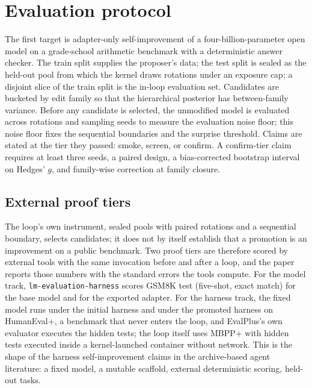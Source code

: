 \section{Evaluation protocol}
\label{sec:evaluation}

The first target is adapter-only self-improvement of a four-billion-parameter open model on a grade-school arithmetic benchmark with a deterministic answer checker. The train split supplies the proposer's data; the test split is sealed as the held-out pool from which the kernel draws rotations under an exposure cap; a disjoint slice of the train split is the in-loop evaluation set. Candidates are bucketed by edit family so that the hierarchical posterior has between-family variance. Before any candidate is selected, the unmodified model is evaluated across rotations and sampling seeds to measure the evaluation noise floor; this noise floor fixes the sequential boundaries and the surprise threshold. Claims are stated at the tier they passed: smoke, screen, or confirm. A confirm-tier claim requires at least three seeds, a paired design, a bias-corrected bootstrap interval on Hedges' $g$, and family-wise correction at family closure.

\subsection{External proof tiers}
\label{sec:eval-external}
The loop's own instrument, sealed pools with paired rotations and a sequential boundary, selects candidates; it does not by itself establish that a promotion is an improvement on a public benchmark. Two proof tiers are therefore scored by external tools with the same invocation before and after a loop, and the paper reports those numbers with the standard errors the tools compute. For the model track, \texttt{lm-evaluation-harness} scores GSM8K test (five-shot, exact match) for the base model and for the exported adapter. For the harness track, the fixed model runs under the initial harness and under the promoted harness on HumanEval+, a benchmark that never enters the loop, and EvalPlus's own evaluator executes the hidden tests; the loop itself uses MBPP+ with hidden tests executed inside a kernel-launched container without network. This is the shape of the harness self-improvement claims in the archive-based agent literature: a fixed model, a mutable scaffold, external deterministic scoring, held-out tasks.

